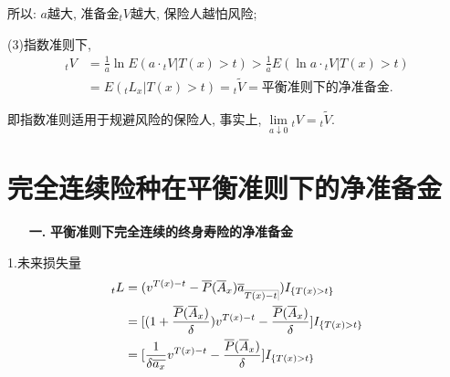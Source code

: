 \documentclass[a4paper,10pt]{ctexbook}
\makeatletter
\newcommand{\hei}{\CJKfamily{hei}}      %
\def\no{\nonumber}
\DeclareRobustCommand{\annu}[1]{_{%
    \def\arraystretch{0}%
    \setlength\arraycolsep{1pt}%
    \setlength\arrayrulewidth{.2pt}%
    \begin{array}[b]{@{}c|}\hline
        \\[\arraycolsep]%
        \scriptstyle #1%
    \end{array}%
}}
\makeatother
\begin{document}
所以: $a$越大, 准备金${}_tV$越大, 保险人越怕风险;

(3)指数准则下,
\begin{align}
    {}_tV & =\frac{1}{a}\ln E(a\cdot{}_tV|T(x)>t)>\frac{1}{a}E(\ln a\cdot {}_tV|T(x)>t)\no \\
          & =E(_tL_x|T(x)>t)={}_t\widetilde{V}=\text{平衡准则下的净准备金.}
\end{align}


即指数准则适用于规避风险的保险人, 事实上, $\underset{a\downarrow 0}{\lim}{}_tV={}_t\widetilde{V}.$

\section{完全连续险种在平衡准则下的净准备金}
\begin{itemize}
    \item[{\bf\hei 一.}]{\bf\hei 平衡准则下完全连续的终身寿险的净准备金}
\end{itemize}

1.未来损失量
\begin{align*}
    {}_tL & =(v^{T(x)-t}-\overline{P}( \overline{A}_x )\overline a_{\annu {T(x)-t}})I_{\{T(x)>t\}}                                      \\
          & =[(1+\frac{\overline{P}( \overline{A}_x )}{\delta})v^{T(x)-t}-\frac{\overline{P}( \overline{A}_x )}{\delta}] I_{\{T(x)>t\}} \\
          & =[\frac{1}{\delta\overline{a_x}}v^{T(x)-t}-\frac{\overline{P}( \overline{A}_x )}{\delta}]I_{\{T(x)>t\}}                     \\
\end{align*}
\end{document}
